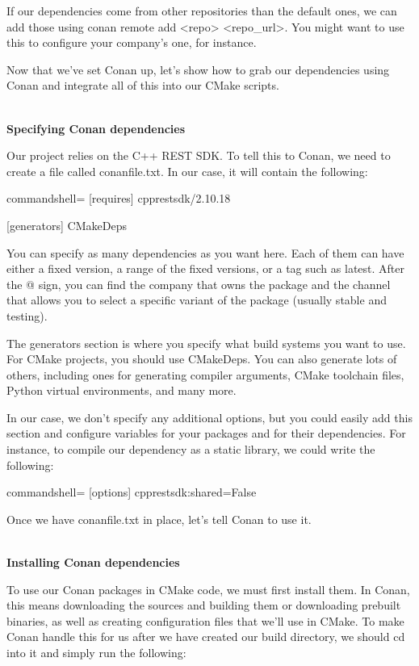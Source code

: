 If our dependencies come from other repositories than the default ones, we can add those using conan remote add <repo> <repo\_url>. You might want to use this to configure your company's one, for instance.

Now that we've set Conan up, let's show how to grab our dependencies using Conan and integrate all of this into our CMake scripts.

\hspace*{\fill} \\ %
\noindent
\textbf{Specifying Conan dependencies}

Our project relies on the C++ REST SDK. To tell this to Conan, we need to create a file called conanfile.txt. In our case, it will contain the following:

\begin{tcblisting}{commandshell={}}
[requires]
cpprestsdk/2.10.18

[generators]
CMakeDeps
\end{tcblisting}

You can specify as many dependencies as you want here. Each of them can have either a fixed version, a range of the fixed versions, or a tag such as latest. After the @ sign, you can find the company that owns the package and the channel that allows you to select a specific variant of the package (usually stable and testing).

The generators section is where you specify what build systems you want to use. For CMake projects, you should use CMakeDeps. You can also generate lots of others, including ones for generating compiler arguments, CMake toolchain files, Python virtual environments, and many more.

In our case, we don't specify any additional options, but you could easily add this section and configure variables for your packages and for their dependencies. For instance, to compile our dependency as a static library, we could write the following:

\begin{tcblisting}{commandshell={}}
[options]
cpprestsdk:shared=False
\end{tcblisting}

Once we have conanfile.txt in place, let's tell Conan to use it.

\hspace*{\fill} \\ %
\noindent
\textbf{Installing Conan dependencies}

To use our Conan packages in CMake code, we must first install them. In Conan, this means downloading the sources and building them or downloading prebuilt binaries, as well as creating configuration files that we'll use in CMake. To make Conan handle this for us after we have created our build directory, we should cd into it and simply run the following:

